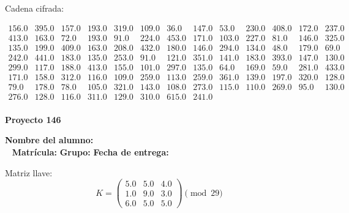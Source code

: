 \documentclass[12pt]{article}
\begin{document}
Cadena cifrada:
\begin{center}
$\begin{array}{lllllllllllll}
156.0 & 395.0 & 157.0 & 193.0 & 319.0 & 109.0 & 36.0 & 147.0 & 53.0 & 230.0 & 408.0 & 172.0 & 237.0\\
413.0 & 163.0 & 72.0 & 193.0 & 91.0 & 224.0 & 453.0 & 171.0 & 103.0 & 227.0 & 81.0 & 146.0 & 325.0\\
135.0 & 199.0 & 409.0 & 163.0 & 208.0 & 432.0 & 180.0 & 146.0 & 294.0 & 134.0 & 48.0 & 179.0 & 69.0\\
242.0 & 441.0 & 183.0 & 135.0 & 253.0 & 91.0 & 121.0 & 351.0 & 141.0 & 183.0 & 393.0 & 147.0 & 130.0\\
299.0 & 117.0 & 188.0 & 413.0 & 155.0 & 101.0 & 297.0 & 135.0 & 64.0 & 169.0 & 59.0 & 281.0 & 433.0\\
171.0 & 158.0 & 312.0 & 116.0 & 109.0 & 259.0 & 113.0 & 259.0 & 361.0 & 139.0 & 197.0 & 320.0 & 128.0\\
79.0 & 178.0 & 78.0 & 105.0 & 321.0 & 143.0 & 108.0 & 273.0 & 115.0 & 110.0 & 269.0 & 95.0 & 130.0\\
276.0 & 128.0 & 116.0 & 311.0 & 129.0 & 310.0 & 615.0 & 241.0\\
\end{array}$
\end{center}

\newpage


\textbf{Proyecto 146}

\textbf{Nombre del alumno:} \underline{\hspace{13cm}}\\\
\vspace{1cm}
\textbf{Matrícula:} \underline{\hspace{4cm}} \hspace{1cm}
\textbf{Grupo:} \underline{\hspace{2cm}}
\textbf{Fecha de entrega:} \underline{\hspace{2cm}}

\medskip

Matriz llave:
\[
K = \begin{pmatrix}
5.0 & 5.0 & 4.0\\
1.0 & 9.0 & 3.0\\
6.0 & 5.0 & 5.0
\end{pmatrix} \pmod{29}
\]
\end{document}
